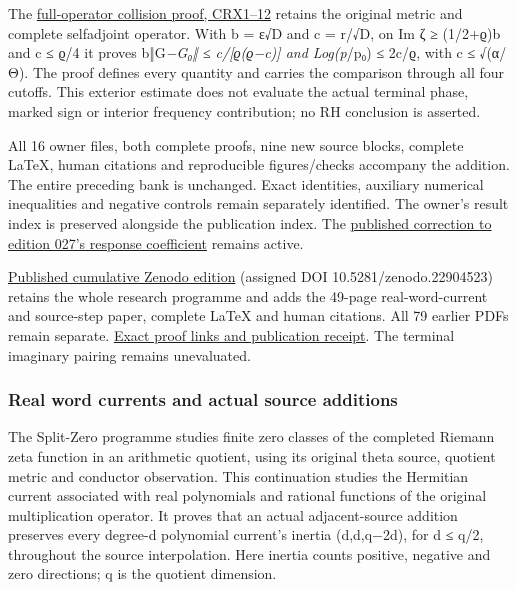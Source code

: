 \documentclass[
]{article}
\begin{document}
The
\href{https://github.com/KokunoYumeto/zeta-function-research-reader/blob/main/workbenches/splitzero-tandem/continuations/20260922-current-collision/COLLISION_RESOLVENT_EXTERIOR.md\#L11}{full-operator
collision proof, CRX1--12} retains the original metric and complete
selfadjoint operator. With b = ε√D and c = \textbar r\textbar/√D, on
\textbar Im ζ\textbar{} ≥ (1/2+ϱ)b and c ≤ ϱ/4 it proves b‖G\emph{−G₀‖ ≤
c/{[}ϱ(ϱ−c){]} and \textbar Log(p}/p₀)\textbar{} ≤ 2c/ϱ, with c ≤
√(α/Θ). The proof defines every quantity and carries the comparison
through all four cutoffs. This exterior estimate does not evaluate the
actual terminal phase, marked sign or interior frequency contribution;
no RH conclusion is asserted.

All 16 owner files, both complete proofs, nine new source blocks,
complete LaTeX, human citations and reproducible figures/checks
accompany the addition. The entire preceding bank is unchanged. Exact
identities, auxiliary numerical inequalities and negative controls
remain separately identified. The owner's result index is preserved
alongside the publication index. The
\href{https://github.com/KokunoYumeto/zeta-function-research-reader/blob/4ba9285b66af58a6d58fc502a494c1fb45ca5b79/workbenches/splitzero-tandem/continuations/20260922-support-transport/CORRECTION_027_RD15.md}{published
correction to edition 027's response coefficient} remains active.

\href{https://zenodo.org/records/22904523}{Published cumulative Zenodo
edition} (assigned DOI 10.5281/zenodo.22904523) retains the whole
research programme and adds the 49-page real-word-current and
source-step paper, complete LaTeX and human citations. All 79 earlier
PDFs remain separate.
\href{https://github.com/KokunoYumeto/zeta-function-research-reader/blob/main/workbenches/splitzero-tandem/continuations/20260922-real-words-source-steps-publication/README.md}{Exact
proof links and publication receipt}. The terminal imaginary pairing
remains unevaluated.

\subsubsection{Real word currents and actual source
additions}\label{real-word-currents-and-actual-source-additions}

The Split-Zero programme studies finite zero classes of the completed
Riemann zeta function in an arithmetic quotient, using its original
theta source, quotient metric and conductor observation. This
continuation studies the Hermitian current associated with real
polynomials and rational functions of the original multiplication
operator. It proves that an actual adjacent-source addition preserves
every degree-d polynomial current's inertia (d,d,q−2d), for d ≤ q/2,
throughout the source interpolation. Here inertia counts positive,
negative and zero directions; q is the quotient dimension.
\end{document}
